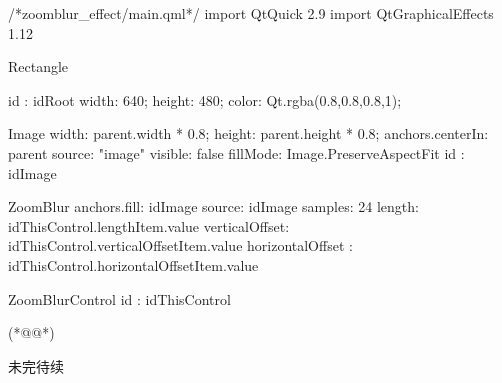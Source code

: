 \label{f000072}    %
\FloatBarrier                                  %
\begin{thebookfilesourceone}[escapeinside={(*@}{@*)},
caption=GoodLuck,
title=\filesourcenumbernameone \thefilesourcenumber
]
/*zoomblur_effect/main.qml*/
import QtQuick 2.9
import QtGraphicalEffects 1.12

Rectangle {
    id : idRoot
    width: 640;
    height: 480;
    color: Qt.rgba(0.8,0.8,0.8,1);

    Image{
        width: parent.width * 0.8;
        height: parent.height * 0.8;
        anchors.centerIn: parent
        source: "image"
        visible: false
        fillMode: Image.PreserveAspectFit
        id : idImage
    }

    ZoomBlur {
        anchors.fill: idImage
        source: idImage
        samples: 24
        length:
            idThisControl.lengthItem.value
        verticalOffset:
            idThisControl.verticalOffsetItem.value
        horizontalOffset :
            idThisControl.horizontalOffsetItem.value
    }

    ZoomBlurControl{
        id : idThisControl
    }

}(*@\marginpar[\hfill\setlength\fboxsep{2pt}\fbox{\footnotesize{\kaishu\parbox{1em}{\setlength{\baselineskip}{2pt}\filesourcenumbernameone}}\footnotesize{\thefilesourcenumber}}]{\setlength\fboxsep{2pt}\fbox{\footnotesize{\kaishu\parbox{1em}{\setlength{\baselineskip}{2pt}\filesourcenumbernameone}}\footnotesize{\thefilesourcenumber}}}@*)\end{thebookfilesourceone}          %
\addtocounter{lstlisting}{-1}   %


未完待续










